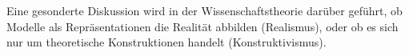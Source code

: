 \documentclass[a4paper, 12pt, pagesize]{scrartcl}
\begin{document}
Eine gesonderte Diskussion wird in der Wissenschaftstheorie darüber geführt, ob Modelle als Repräsentationen die Realität abbilden (Realismus), oder ob es sich nur um theoretische Konstruktionen handelt (Konstruktivismus).
%
%
%
%
\end{document}

